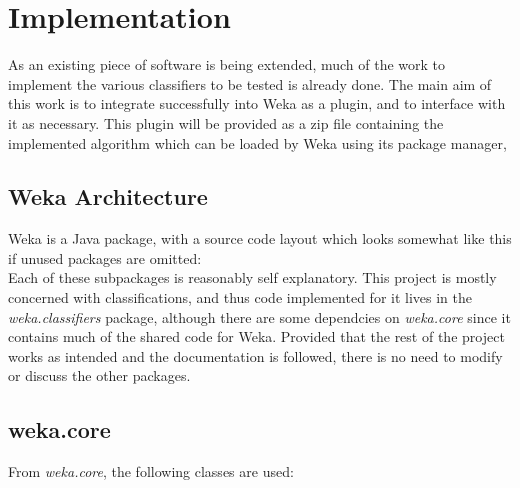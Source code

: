 \section{Implementation}
As an existing piece of software is being extended, much of the work to implement the various classifiers to be tested is already done. The main aim of this work is to integrate successfully into Weka as a plugin, and to interface with it as necessary. This plugin will be provided as a zip file containing the implemented algorithm which can be loaded by Weka using its package manager, 
\subsection{Weka Architecture}
Weka is a Java package, with a source code layout which looks somewhat like this if unused packages are omitted: \\
\hfill \break
Each of these subpackages is reasonably self explanatory. This project is mostly concerned with classifications, and thus code implemented for it lives in the \textit{weka.classifiers} package, although there are some dependcies on \textit{weka.core} since it contains much of the shared code for Weka. Provided that the rest of the project works as intended and the documentation is followed, there is no need to modify or discuss the other packages.

\subsection{weka.core}
From \textit{weka.core}, the following classes are used:

